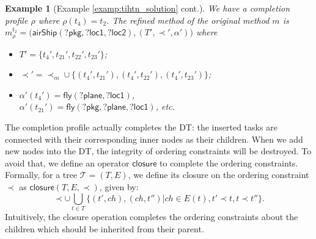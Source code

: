 \documentclass[letterpaper]{article} %
\newtheorem{examp}{Example}
\newcommand{\plan}{\sigma}
\newcommand{\Dtree}{\mathcal{T}}
\newcommand{\improveFunction}{\rho}
\newcommand{\BEF}{\mathsf{B}}
\newcommand{\AFT}{\mathsf{A}}
\newcommand{\closure}{\mathsf{closure}}
\begin{document}
\begin{examp}[Example \ref{examp:tihtn_solution} cont.]
We have a completion profile $\improveFunction$ where $\improveFunction(t_4)\!=\!t_2$. %
The refined method of the original method $m$ is $m_\improveFunction^{t_2}{=}\mathsf{(airShip(?pkg{,}?loc1{,}?loc2)},(T'{,}{\prec}'{,}\alpha'))$ where
\begin{itemize}
\item $T' = \{t_4',t_{21}',t_{22}',t_{23}'\}$;
\item $\prec' = \prec_m \cup \{(t_4',t_{21}'),(t_4',t_{22}'),(t_4',t_{23}')\}$;
\item $\alpha'(t_4') = \mathsf{fly(?plane,?loc1)}$,\\ $\alpha'(t_{21}')= \mathsf{fly(?pkg,?plane,?loc1)}$, etc.
\end{itemize}
\end{examp}

The completion profile actually completes the DT: the inserted tasks are connected with their corresponding inner nodes as their children.
When we add new nodes into the DT, the integrity of ordering constraints will be destroyed.
To avoid that, we define an operator $\closure$ to complete the ordering constraints.
Formally, for a tree $\Dtree=(T,E)$, we define its closure on the ordering constraint $\prec$ as $\closure(T,E,\prec)$, given by:
  $$
  \prec \cup  \bigcup_{t\in T}\{(t',ch),(ch,t'')| ch \in E(t), t'\prec t, t\prec t''\}.$$
Intuitively, the closure operation completes the ordering constraints about the children which should be inherited from their parent.
\end{document}
